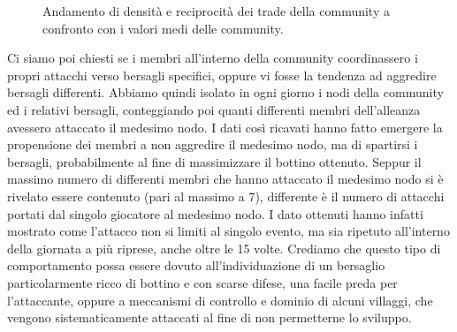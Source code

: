 \begin{figure}
	\hfill
	\caption{Andamento di densità e reciprocità dei trade della community a confronto con i valori medi delle community.}
	\label{fig:most_imp_trade}
\end{figure}

Ci siamo poi chiesti se i membri all'interno della community coordinassero i propri attacchi verso bersagli specifici, oppure vi fosse la tendenza ad aggredire bersagli differenti. Abbiamo quindi isolato in ogni giorno i nodi della community ed i relativi bersagli, conteggiando poi quanti differenti membri dell'alleanza avessero attaccato il medesimo nodo. I dati così ricavati hanno fatto emergere la propensione dei membri a non aggredire il medesimo nodo, ma di spartirsi i bersagli, probabilmente al fine di massimizzare il bottino ottenuto.
Seppur il massimo numero di differenti membri che hanno attaccato il medesimo nodo si è rivelato essere contenuto (pari al massimo a 7), differente è il numero di attacchi portati dal singolo giocatore al medesimo nodo. I dato ottenuti hanno infatti mostrato come l'attacco non si limiti al singolo evento, ma sia ripetuto all'interno della giornata a più riprese, anche oltre le 15 volte.
Crediamo che questo tipo di comportamento possa essere dovuto all'individuazione di un bersaglio particolarmente ricco di bottino e con scarse difese, una facile preda per l'attaccante, oppure a meccanismi di controllo e dominio di alcuni villaggi, che vengono sistematicamente attaccati al fine di non permetterne lo sviluppo.

